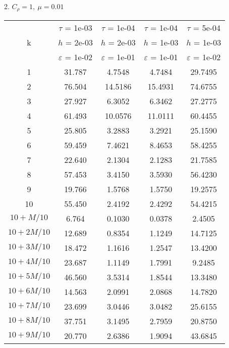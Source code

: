 2. $C_{\rho} = 1, \ \mu = 0.01$
\begin{center}
	\begin{tabular}{ |c|c|c|c|c| } 
		\hline
		 & $\tau$ = 1e-03 & $\tau$ = 1e-04 & $\tau$ = 1e-04 & $\tau$ = 5e-04 \\ 
		k & $h$ = 2e-03 & $h$ = 2e-03 & $h$ = 1e-03 & $h$ = 1e-03 \\ 
		& $\varepsilon$ = 1e-02 & $\varepsilon$ = 1e-01 & $\varepsilon$ = 1e-01 & $\varepsilon$ = 1e-02 \\ 
		\hline
		1 & 31.787 & 4.7548 & 4.7484 & 29.7495 \\
		\hline
		2 & 76.504 & 14.5186 & 15.4931 & 74.6755 \\
		\hline
		3 & 27.927 & 6.3052 & 6.3462 & 27.2775 \\
		\hline
		4 & 61.493 & 10.0576 & 11.0111 & 60.4455 \\
		\hline
		5 & 25.805 & 3.2883 & 3.2921 & 25.1590 \\
		\hline
		6 & 59.459 & 7.4621 & 8.4653 & 58.4255 \\
		\hline
		7 & 22.640 & 2.1304 & 2.1283 & 21.7585 \\
		\hline
		8 & 57.453 & 3.4150 & 3.5930 & 56.4230 \\
		\hline
		9 & 19.766 & 1.5768 & 1.5750 & 19.2575 \\
		\hline
		10 & 55.450 & 2.4192 & 2.4292 & 54.4215 \\
		\hline
		$10 + M/10$ & 6.764 & 0.1030 & 0.0378 & 2.4505 \\
		\hline
		$10 + 2M/10$ & 12.689 & 0.8354 & 1.1249 & 14.7125 \\
		\hline
		$10 + 3M/10$ & 18.472 & 1.1616 & 1.2547 & 13.4200 \\
		\hline
		$10 + 4M/10$ & 23.687 & 1.1149 & 1.7991 & 9.2485 \\
		\hline
		$10 + 5M/10$ & 46.560 & 3.5314 & 1.8544 & 13.3480 \\
		\hline
		$10 + 6M/10$ & 14.563 & 2.0991 & 2.0868 & 14.7820 \\
		\hline
		$10 + 7M/10$ & 23.699 & 3.0446 & 3.0482 & 25.6155 \\
		\hline
		$10 + 8M/10$ & 37.751 & 3.1495 & 2.7959 & 20.8750 \\
		\hline
		$10 + 9M/10$ & 20.770 & 2.6386 & 1.9094 & 43.6845 \\
		\hline
	\end{tabular}
\end{center}

